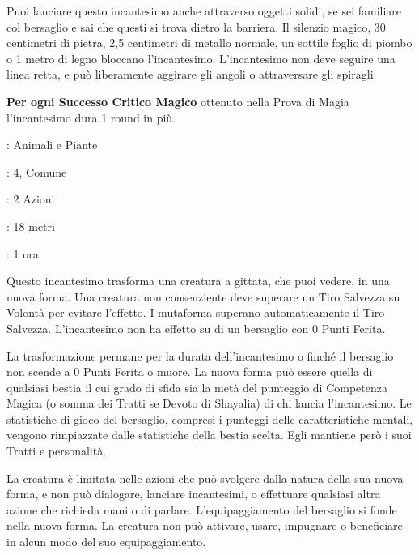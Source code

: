 \begin{multicols}{2}
Puoi lanciare questo incantesimo anche attraverso oggetti solidi, se sei familiare col bersaglio e sai che questi si trova dietro la barriera. Il silenzio magico, 30 centimetri di pietra, 2,5 centimetri di metallo normale, un sottile foglio di piombo o 1 metro di legno bloccano l'incantesimo. L'incantesimo non deve seguire una linea retta, e può liberamente aggirare gli angoli o attraversare gli spiragli.

\textbf{Per ogni Successo Critico Magico} ottenuto nella Prova di Magia l'incantesimo dura 1 round in più.

\noindent\colorbox{OBSSgold!10}{
\begin{minipage}{0.95\linewidth}
\begin{description}[noitemsep, topsep=0pt, parsep=0pt, partopsep=0pt, leftmargin=0cm, labelwidth=1.3cm]
	\item[\textbf{Lista}]: Animali e Piante
	\item[\textbf{Livello}]: 4, Comune
	\item[\textbf{Lancio}]: 2 Azioni
	\item[\textbf{Gittata}]: 18 metri
	\item[\textbf{Durata}]: 1 ora
\end{description}
\end{minipage}}\smallskip

Questo incantesimo trasforma una creatura a gittata, che puoi vedere, in una nuova forma. Una creatura non consenziente deve superare un Tiro Salvezza su Volontà per evitare l'effetto. I mutaforma superano automaticamente il Tiro Salvezza. L'incantesimo non ha effetto su di un bersaglio con 0 Punti Ferita.

La trasformazione permane per la durata dell'incantesimo o finché il bersaglio non scende a 0 Punti Ferita o muore. La nuova forma può essere quella di qualsiasi bestia il cui grado di sfida sia la metà del punteggio di Competenza Magica (o somma dei Tratti se Devoto di Shayalia) di chi lancia l'incantesimo. Le statistiche di gioco del bersaglio, compresi i punteggi delle caratteristiche mentali, vengono rimpiazzate dalle statistiche della bestia scelta. Egli mantiene però i suoi Tratti e personalità.

La creatura è limitata nelle azioni che può svolgere dalla natura della sua nuova forma, e non può dialogare, lanciare incantesimi, o effettuare qualsiasi altra azione che richieda mani o di parlare. L'equipaggiamento del bersaglio si fonde nella nuova forma. La creatura non può attivare, usare, impugnare o beneficiare in alcun modo del suo equipaggiamento.


\end{multicols}
